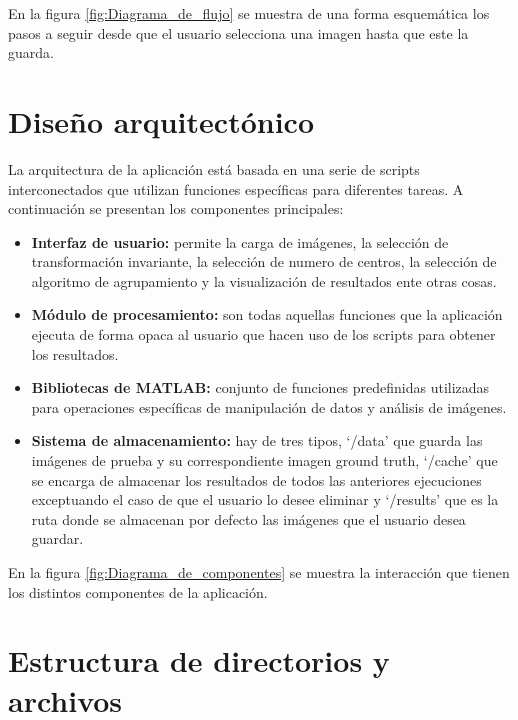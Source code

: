 En la figura \ref{fig:Diagrama_de_flujo} se muestra de una forma esquemática los pasos a seguir desde que el usuario selecciona una imagen hasta que este la guarda.

\section{Diseño arquitectónico}\label{diseño-arquitectónico}

La arquitectura de la aplicación está basada en una serie de scripts interconectados que utilizan funciones específicas para diferentes tareas. A continuación se presentan los componentes principales:

\begin{itemize}
    \item \textbf{Interfaz de usuario:} permite la carga de imágenes, la selección de transformación invariante, la selección de numero de centros, la selección de algoritmo de agrupamiento y la visualización de resultados ente otras cosas.
    \item \textbf{Módulo de procesamiento:} son todas aquellas funciones que la aplicación ejecuta de forma opaca al usuario que hacen uso de los scripts para obtener los resultados.
    \item \textbf{Bibliotecas de MATLAB:} conjunto de funciones predefinidas utilizadas para operaciones específicas de manipulación de datos y análisis de imágenes.
    \item \textbf{Sistema de almacenamiento:} hay de tres tipos, `/data' que guarda las imágenes de prueba y su correspondiente imagen ground truth, `/cache' que se encarga de almacenar los resultados de todos las anteriores ejecuciones exceptuando el caso de que el usuario lo desee eliminar y `/results' que es la ruta donde se almacenan por defecto las imágenes que el usuario desea guardar.
\end{itemize}


En la figura \ref{fig:Diagrama_de_componentes} se muestra la interacción que tienen los distintos componentes de la aplicación.


\section{Estructura de directorios y archivos}\label{estructura-de-directorios-y-archivos}

